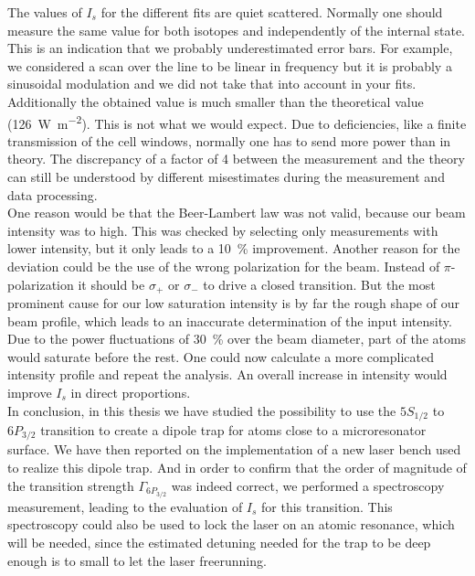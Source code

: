 The values of \(I_{s}\) for the different fits are quiet scattered. Normally
one should measure the same value for both isotopes and independently of the
internal state. This is an indication that we probably
underestimated error bars. For example, we considered a scan over the line to be
linear in frequency but it is probably a sinusoidal modulation and we did not
take that into account in your fits. Additionally the obtained value is 
much smaller than the theoretical value (\SI{126}{\watt\per\meter\squared}).
This is not what we would expect. Due to deficiencies, like a finite transmission
of the cell windows, normally one has to send more power than in theory. The 
discrepancy of a factor of 4 between the measurement and the theory can still be
understood by different misestimates during the measurement and data processing. \\
One reason would be that the Beer-Lambert law was not valid, because our beam 
intensity was to high. This was checked by selecting only measurements with lower
intensity, but it only leads to a \SI{10}{\percent} improvement. 
Another reason for the deviation could be the use of the wrong polarization for
the beam. Instead of \(\pi \)-polarization it should be \(\sigma_{+}\) or 
\(\sigma_{-}\) to drive a closed transition.  
But the most prominent cause for our low saturation intensity is by far the rough 
shape of our beam profile, which leads to an inaccurate determination of the input 
intensity. Due to the power fluctuations of \SI{30}{\percent} over the beam diameter, 
part of the atoms would saturate before the rest. One could now calculate a more
complicated intensity profile and repeat the analysis. An overall increase in 
intensity would improve \(I_{s}\) in direct proportions.\\
In conclusion, in this thesis we have studied the possibility to use the \(5S_{1/2}\)
to \(6P_{3/2}\) transition to create a dipole trap for atoms close to a microresonator
surface. We have then reported on the implementation of a new laser bench used
to realize this dipole trap. And in order to confirm that the order of magnitude
of the transition strength \(\Gamma_{6P_{3/2}}\) was indeed correct, we performed
a spectroscopy measurement, leading to the evaluation of \(I_{s}\) for this
transition. This spectroscopy could also be used to lock the laser on an atomic
resonance, which will be needed, since the estimated detuning needed for the trap
to be deep enough is to small to let the laser freerunning. 

